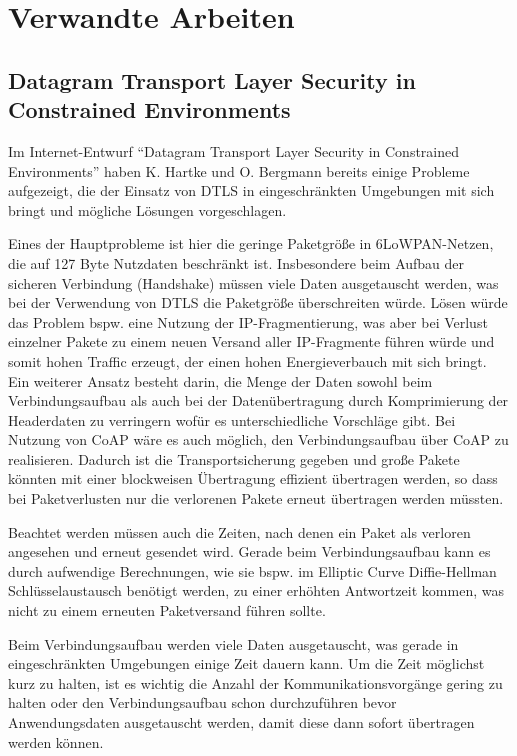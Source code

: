 \section{Verwandte Arbeiten}

\subsection{Datagram Transport Layer Security in Constrained Environments}
Im Internet-Entwurf "`Datagram Transport Layer Security in Constrained Environments"' \cite{draftcodtls} haben K. Hartke und O. Bergmann
bereits einige Probleme aufgezeigt, die der Einsatz von DTLS in eingeschränkten Umgebungen mit sich bringt und mögliche Lösungen vorgeschlagen.

Eines der Hauptprobleme ist hier die geringe Paketgröße in 6LoWPAN-Netzen, die auf 127 Byte Nutzdaten beschränkt ist. Insbesondere beim Aufbau der
sicheren Verbindung (Handshake) müssen viele Daten ausgetauscht werden, was bei der Verwendung von DTLS die Paketgröße überschreiten würde. Lösen
würde das Problem bspw. eine Nutzung der IP-Fragmentierung, was aber bei Verlust einzelner Pakete zu einem neuen Versand aller IP-Fragmente führen
würde und somit hohen Traffic erzeugt, der einen hohen Energieverbauch mit sich bringt. Ein weiterer Ansatz besteht darin, die Menge der Daten sowohl
beim Verbindungsaufbau als auch bei der Datenübertragung durch Komprimierung der Headerdaten zu verringern wofür es unterschiedliche Vorschläge gibt.
Bei Nutzung von CoAP wäre es auch möglich, den Verbindungsaufbau über CoAP zu realisieren. Dadurch ist die Transportsicherung gegeben und große Pakete
könnten mit einer blockweisen Übertragung effizient übertragen werden, so dass bei Paketverlusten nur die verlorenen Pakete erneut übertragen werden müssten.

Beachtet werden müssen auch die Zeiten, nach denen ein Paket als verloren angesehen und erneut gesendet wird. Gerade beim Verbindungsaufbau
kann es durch aufwendige Berechnungen, wie sie bspw. im Elliptic Curve Diffie-Hellman Schlüsselaustausch benötigt werden, zu einer erhöhten
Antwortzeit kommen, was nicht zu einem erneuten Paketversand führen sollte.

Beim Verbindungsaufbau werden viele Daten ausgetauscht, was gerade in eingeschränkten Umgebungen einige Zeit dauern kann. Um die Zeit
möglichst kurz zu halten, ist es wichtig die Anzahl der Kommunikationsvorgänge gering zu halten oder den Verbindungsaufbau schon durchzuführen
bevor Anwendungsdaten ausgetauscht werden, damit diese dann sofort übertragen werden können.

